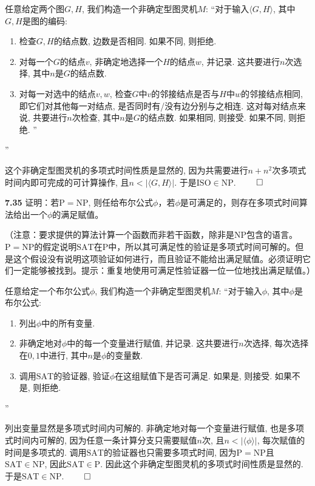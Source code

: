 \documentclass[UTF8]{report}
\renewcommand{\P}{\mathbb{P}} %
\newcommand{\problem}[1]{{\setlength{\parskip}{10pt}\noindent \bf{#1}}}
\renewenvironment{proof}{{\setlength{\parskip}{7pt}\noindent\hskip 2em \bf 证明 \quad}}{\hfill$\qed$\par}
\newcommand{\NP}{\mathrm{NP}}
\newcommand{\ISO}{\mathrm{ISO}}
\newcommand{\SAT}{\mathrm{SAT}}
\renewcommand{\P}{\mathrm{P}}
\begin{document}
\begin{proof}
    任意给定两个图$G, H$, 我们构造一个非确定型图灵机$M$:
    ``对于输入$\langle G, H \rangle$, 其中$G, H$是图的编码:
    \begin{enumerate}
        \item 检查$G, H$的结点数, 边数是否相同. 如果不同, 则拒绝.
        \item 对每一个$G$的结点$v$, 非确定地选择一个$H$的结点$w$, 并记录. 这共要进行$n$次选择, 其中$n$是$G$的结点数.
        \item 对每一对选中的结点$v, w$, 检查$G$中$v$的邻接结点是否与$H$中$w$的邻接结点相同, 即它们对其他每一对结点, 是否同时有/没有边分别与之相连. 这对每对结点来说, 共要进行$n$次检查, 其中$n$是$G$的结点数. 如果相同, 则接受. 如果不同, 则拒绝.
        ''
    \end{enumerate}
    ''

    这个非确定型图灵机的多项式时间性质是显然的, 因为共需要进行$n + n^2$次多项式时间内即可完成的可计算操作, 且$n < |\langle G, H \rangle|$. 于是$\ISO \in \NP$.
\end{proof}


\problem{7.35} 证明：若$\P=\NP$, 则任给布尔公式$\phi$，若$\phi$是可满足的，则存在多项式时间算法给出一个$\phi$的满足赋值。

（注意：要求提供的算法计算一个函数而非若干函数，除非是$\NP$包含的语言。$\P = \NP$的假定说明$\SAT$在$\P$中，所以其可满足性的验证是多项式时间可解的。但是这个假设没有说明这项验证如何进行，而且验证不能给出满足赋值。必须证明它们一定能够被找到。提示：重复地使用可满足性验证器一位一位地找出满足赋值。）

\begin{proof}
    任意给定一个布尔公式$\phi$, 我们构造一个非确定型图灵机$M$:
    ``对于输入$\phi$, 其中$\phi$是布尔公式:
    \begin{enumerate}
        \item 列出$\phi$中的所有变量.
        \item 非确定地对$\phi$中的每一个变量进行赋值, 并记录. 这共要进行$n$次选择, 每次选择在$0,1$中进行, 其中$n$是$\phi$的变量数.
        \item 调用$\SAT$的验证器, 验证$\phi$在这组赋值下是否可满足. 如果是, 则接受. 如果不是, 则拒绝.
    \end{enumerate}
    ''

    列出变量显然是多项式时间内可解的. 非确定地对每一个变量进行赋值, 也是多项式时间内可解的, 因为任意一条计算分支只需要赋值$n$次, 且$n < |\langle \phi\rangle|$, 每次赋值的时间是多项式的. 调用$\SAT$的验证器也只需要多项式时间, 因为$\P = \NP$且$\SAT \in \NP$, 因此$\SAT \in \P$. 因此这个非确定型图灵机的多项式时间性质是显然的. 于是$\SAT \in \NP$.
\end{proof}
\end{document}
